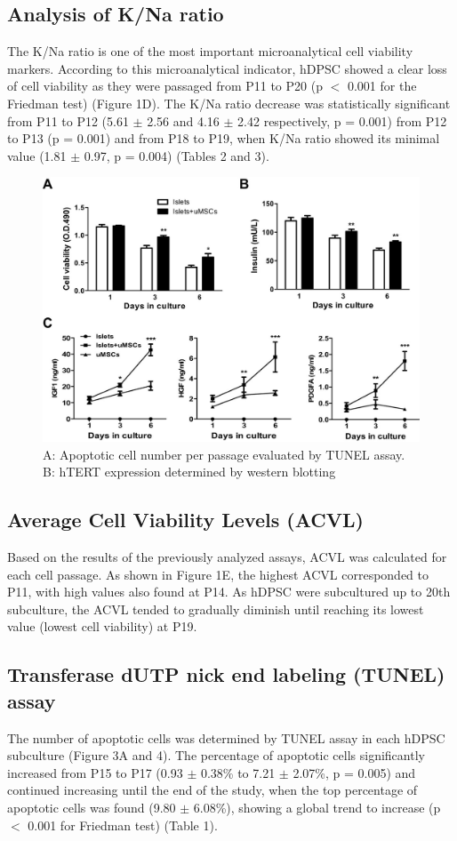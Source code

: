 \documentclass[a4paper,12pt]{article}
\begin{document}
\subsection{Analysis of K/Na ratio}
The K/Na ratio is one of the most important microanalytical cell viability markers. According to this microanalytical indicator, hDPSC showed a clear loss of cell viability as they were passaged from P11 to P20 (p $<$ 0.001 for the Friedman test) (Figure 1D). The K/Na ratio decrease was statistically significant from P11 to P12 (5.61 $\pm$ 2.56 and 4.16 $\pm$ 2.42 respectively, p = 0.001) from P12 to P13 (p = 0.001) and from P18 to P19, when K/Na ratio showed its minimal value (1.81 $\pm$ 0.97, p = 0.004) (Tables 2 and 3).

\begin{center}
\begin{figure}
\includegraphics[width=7 cm]{fig2}
\caption{A: Apoptotic cell number per passage evaluated by TUNEL assay. B: hTERT expression determined by western blotting}
\label{Figure 2}
\end{figure}
\end{center}



\subsection{Average Cell Viability Levels (ACVL)}
Based on the results of the previously analyzed assays, ACVL was calculated for each cell passage. As shown in Figure 1E, the highest ACVL corresponded to P11, with high values also found at P14. As hDPSC were subcultured up to 20th subculture, the ACVL tended to gradually diminish until reaching its lowest value (lowest cell viability) at P19.

\subsection{Transferase dUTP nick end labeling (TUNEL) assay}
The number of apoptotic cells was determined by TUNEL assay in each hDPSC subculture (Figure 3A and 4). The percentage of apoptotic cells significantly increased from P15 to P17 (0.93 $\pm$ 0.38\% to 7.21 $\pm$ 2.07\%, p = 0.005) and continued increasing until the end of the study, when the top percentage of apoptotic cells was found (9.80 $\pm$ 6.08\%), showing a global trend to increase (p $<$ 0.001 for Friedman test) (Table 1).
\end{document}
